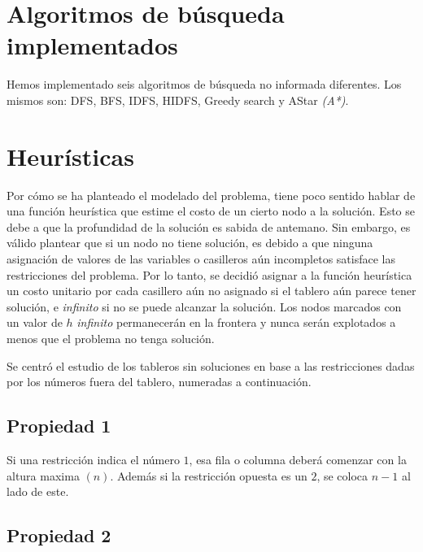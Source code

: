 \documentclass[%
    final,
    reprint,
    notitlepage,
    narroweqnarray,
    inline,
    twoside,
    invited
    ]{ieee}
\begin{document}
\section{Algoritmos de búsqueda implementados}

\par Hemos implementado seis algoritmos de búsqueda no informada diferentes. Los mismos son: DFS, BFS, IDFS, HIDFS, Greedy search y AStar \textit{(A*)}.

\section{Heurísticas}

\par Por cómo se ha planteado el modelado del problema, tiene poco sentido hablar de una función heurística que estime el costo de un cierto nodo 
a la solución. Esto se debe a que la profundidad de la solución es sabida de antemano. Sin embargo, es válido plantear que si un nodo 
no tiene solución, es debido a que ninguna asignación de valores de las variables o casilleros aún incompletos satisface las restricciones del problema. Por lo tanto, 
se decidió asignar a la función heurística un costo unitario por cada casillero aún no asignado si el tablero aún parece tener solución, e \textit{infinito}
si no se puede alcanzar la solución. Los nodos marcados con un valor de $h$ \textit{infinito} permanecerán en la frontera y nunca serán explotados a menos que 
el problema no tenga solución.
\par Se centró el estudio de los tableros sin soluciones en base a las restricciones dadas por los números fuera del tablero, numeradas a continuación.\\

\subsection{Propiedad 1}

\par Si una restricción indica el número $1$, esa fila o columna deberá comenzar con la altura maxima $(n)$. Además si la restricción opuesta es un $2$, se coloca $n-1$ al lado de este.

\subsection{Propiedad 2}
\end{document}
